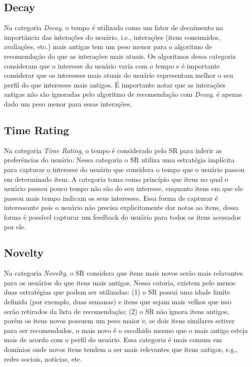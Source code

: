 \subsection{Decay}\label{section:decay}

Na categoria \textit{Decay}, o tempo é utilizado como um fator de decaimento na importância das interações do usuário, i.e.,
interações (itens consumidos, avaliações, etc.) mais antigas tem um peso menor para o algoritmo de recomendação do que
as interações mais atuais. Os algoritmos dessa categoria consideram que o interesse do usuário varia com o tempo e é
importante considerar que os interesses mais atuais do usuário representam melhor o seu perfil do que interesses mais
antigos. É importante notar que as interações antigas não são ignoradas pelo algoritmo de recomendação com \textit{Decay}, é
apenas dado um peso menor para essas interações.

\subsection{Time Rating}

Na categoria \textit{Time Rating}, o tempo é considerado pelo SR para inferir as preferências do usuário. Nessa categoria o SR
utiliza uma estratégia implícita para capturar o interesse do usuário que considera o tempo que o usuário passou em
determinado item. A categoria toma como princípio que itens no qual o usuário passou pouco tempo não são do seu
interesse, enquanto itens em que ele passou mais tempo indicam os seus interesses. Essa forma de capturar é interessante
pois o usuário não precisa explicitamente dar notas ao itens, dessa forma é possível capturar um feedback do usuário
para todos os itens acessados por ele.

\subsection{Novelty}

Na categoria \textit{Novelty}, o SR considera que itens mais novos serão mais relavantes para os usuários do que itens mais
antigos. Nessa catoria, existem pelo menos duas estratégias que podem ser utilizadas: (1) o SR possui uma idade limite
definida (por exemplo, duas semanas) e itens que sejam mais velhos que isso serão retirados da lista de recomendação;
(2) o SR não ignora itens antigos, porém os itens novos possuem um peso maior e, se dois itens similares estiver para
ser recomendados, o mais novo é o escolhido mesmo que o mais antigo esteja mais de acordo com o perfil do usuário.
Essa categoria é mais comum em domínios onde novos itens tendem a ser mais relevantes que itens antigos, e.g., redes
sociais, notícias, etc.

